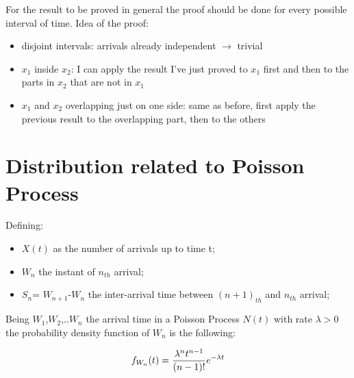 \begin{itemize}
            For the result to be proved in general the proof should be done for every possible interval of time. Idea of the proof:
            \begin{itemize}
              \item disjoint intervals: arrivals already independent $\rightarrow$ trivial
              \item $x_1$ inside $x_2$: I can apply the result I've just proved to $x_1$ first and then to the parts in $x_2$ that are not in $x_1$
              \item $x_1$ and $x_2$ overlapping just on one side: same as before, first apply the previous result to the overlapping part, then to the others
            \end{itemize}
        
        
       
  \end{itemize}
\section{Distribution related to Poisson Process}
Defining: 
\begin{itemize}
	\item $X(t)$ as the number of arrivals up to time t;
	\item $W_n$ the instant of $n_{th}$ arrival;
	\item $S_n$= $W_{n+1}$-$W_n$ the inter-arrival time between $(n+1)_{th}$ and $n_{th}$ arrival;
\end{itemize}


	\begin{theorem}
		Being $W_{1}$,$W_{2}$,..$W_{n}$ the arrival time in a Poisson Process $N(t)$ with rate ${\lambda}>0$ the probability density function of $W_n$ is the following:
		
			\begin{equation}
			f_{W_n} (t )=\frac{\lambda^n t^{n-1}} {(n-1)!}e^{-\lambda t} \\
			\end{equation}
	\end{theorem}

